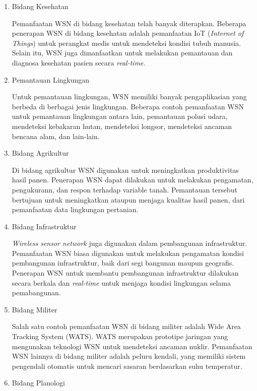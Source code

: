 \begin{enumerate}
    \item Bidang Kesehatan
    
    Pemanfaatan WSN di bidang kesehatan telah banyak diterapkan. Beberapa penerapan WSN di bidang kesehatan adalah pemanfaatan IoT (\textit{Internet of Things}) untuk perangkat medis untuk mendeteksi kondisi tubuh manusia. Selain itu, WSN juga dimanfaatkan untuk melakukan pemantauan dan diagnosa kesehatan pasien secara \textit{real-time}.
    
    \item Pemantauan Lingkungan
    
    Untuk pemantauan lingkungan, WSN memiliki banyak pengaplikasian yang berbeda di berbagai jenis lingkungan. Beberapa contoh pemanfaatan WSN untuk pemantauan lingkungan antara lain, pemantauan polusi udara, mendeteksi kebakaran hutan, mendeteksi longsor, mendeteksi ancaman bencana alam, dan lain-lain.  
    
    \item Bidang Agrikultur
    
    Di bidang agrikultur WSN digunakan untuk meningkatkan produktivitas hasil panen. Penerapan WSN dapat dilakukan untuk melakukan pengamatan, pengukurann, dan respon terhadap variable tanah. Pemantauan tersebut bertujuan untuk meningkatkan ataupun menjaga kualitas hasil panen, dari pemanfaatan data lingkungan pertanian. 
    
    
    \item Bidang Infrastruktur
    
    \textit{Wireless sensor network} juga digunakan dalam pembangunan infrastruktur. Pemanfaatan WSN biasa digunakan untuk melakukan pengamatan kondisi pembangunan infrastruktur, baik dari segi bangunan maupun geografis. Penerapan WSN untuk membantu pembangunan infrastruktur dilakukan secara berkala dan \textit{real-time} untuk menjaga kondisi lingkungan selama pemabangunan.
    
    \item Bidang Militer
    
    Salah satu contoh pemanfaatan WSN di bidang militer adalah Wide Area Tracking System (WATS). WATS merupakan prototipe jaringan yang mengunakan teknologi WSN untuk mendeteksi ancaman nuklir. Pemanfaatan WSN lainnya di bidang militer adalah peluru kendali, yang memiliki sistem pengendali otomatis untuk mencari sasaran berdasarkan suhu temperatur.
    
    \item Bidang Planologi
    

\end{enumerate}
